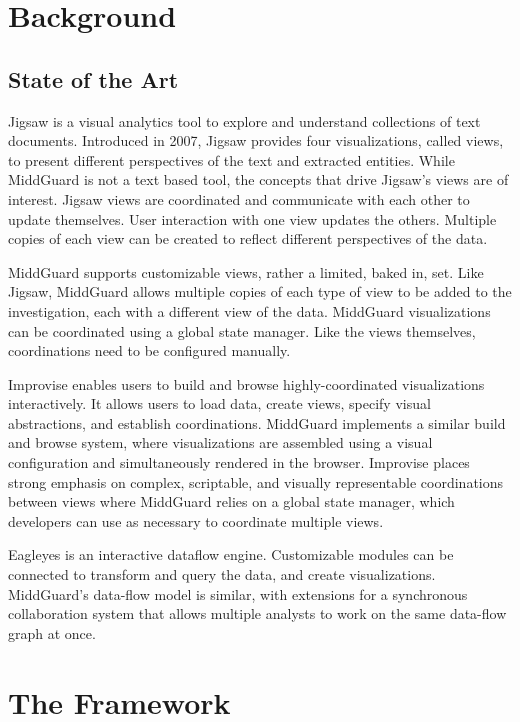 \documentclass[midd]{thesis}
\begin{document}
\chapter{Background}

\section{State of the Art}

Jigsaw \cite{Stasko:2008:JSI:1466620.1466622} is a visual analytics tool to
explore and understand collections of text documents. Introduced in 2007, Jigsaw
provides four visualizations, called views, to present different perspectives of
the text and extracted entities. While MiddGuard is not a text based tool, the
concepts that drive Jigsaw's views are of interest. Jigsaw views are coordinated
and communicate with each other to update themselves. User interaction with one
view updates the others. Multiple copies of each view can be created to reflect
different perspectives of the data.

MiddGuard supports customizable views, rather a limited, baked in, set. Like
Jigsaw, MiddGuard allows multiple copies of each type of view to be added to the
investigation, each with a different view of the data. MiddGuard visualizations
can be coordinated using a global state manager. Like the views themselves,
coordinations need to be configured manually.

Improvise \cite{weaver-2004a} enables users to build and browse
highly-coordinated visualizations interactively. It allows users to load data,
create views, specify visual abstractions, and establish coordinations.
MiddGuard implements a similar build and browse system, where visualizations are
assembled using a visual configuration and simultaneously rendered in the
browser. Improvise places strong emphasis on complex, scriptable, and visually
representable coordinations between views where MiddGuard relies on a global
state manager, which developers can use as necessary to coordinate multiple
views.

Eagleyes \cite{7347662} is an interactive dataflow engine. Customizable modules
can be connected to transform and query the data, and create visualizations.
MiddGuard's data-flow model is similar, with extensions for a synchronous
collaboration system that allows multiple analysts to work on the same data-flow
graph at once.

\chapter{The Framework}
\end{document}

